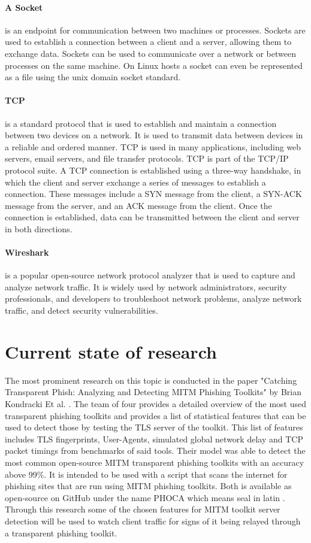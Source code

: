 \documentclass[12pt]{scrbook}
\begin{document}
\paragraph{A Socket} is an endpoint for communication between two machines or
processes. Sockets are used to establish a connection between a client and a
server, allowing them to exchange data. Sockets can be used to communicate over
a network or between processes on the same machine. On Linux hosts a socket can
even be represented as a file using the unix domain socket standard.

\paragraph{TCP} is a standard protocol that is used to establish and maintain a
connection between
two devices on a network. It is used to transmit data between devices in a
reliable and ordered manner. TCP is used in many applications, including web
servers,
email servers, and file transfer protocols. TCP is part of the TCP/IP protocol
suite.
A TCP connection is established using a three-way handshake, in which the client
and server
exchange a series of messages to establish a connection. These messages include
a SYN message
from the client, a SYN-ACK message from the server, and an ACK message from the
client.
Once the connection is established, data can be transmitted between the client
and server in both directions.

\paragraph{Wireshark} is a popular open-source network protocol
analyzer that is used to capture and analyze network traffic. It is widely used
by network administrators, security professionals, and developers to
troubleshoot network problems, analyze network traffic, and detect security
vulnerabilities.

\newpage \section{Current state of research}
The most prominent research on this topic is conducted in the paper
"Catching Transparent Phish: Analyzing and Detecting MITM Phishing Toolkits"
by Brian Kondracki Et al. \cite{kondracki2021catching}.
The team of four provides a detailed overview of the most used transparent
phishing toolkits and provides a list of statistical features that can be used to detect
those by testing the TLS server of the toolkit.
This list of features includes TLS fingerprints, User-Agents, simulated global
network delay and TCP packet timings from benchmarks of said tools.
Their model was able to detect the most common open-source MITM transparent
phishing toolkits with an accuracy above 99\%.
It is intended to be used with a script that scans the internet for phishing
sites that are run using MITM phishing toolkits.
Both is available as open-source on GitHub under the name PHOCA which means seal
in latin \cite{kondracki2021catchingGit}.
Through this research some of the chosen features for MITM toolkit server
detection will be used to watch client traffic for signs of it being relayed
through a transparent phishing toolkit.
\end{document}
